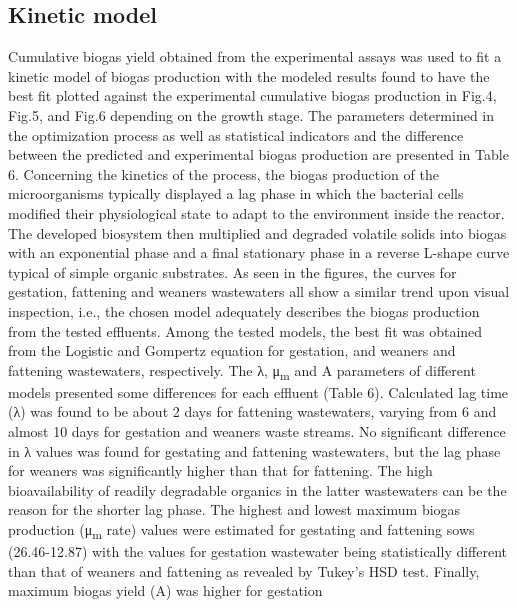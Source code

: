 \subsection{Kinetic model}
Cumulative biogas yield obtained from the experimental assays was used to fit a kinetic model of biogas production with the modeled results found to have the best fit plotted against the experimental cumulative biogas production in Fig.4, Fig.5, and Fig.6 depending on the growth stage. The parameters determined in the optimization process as well as statistical indicators and the difference between the predicted and experimental biogas production are presented in Table 6.
Concerning the kinetics of the process, the biogas production of the microorganisms typically displayed a lag phase in which the bacterial cells modified their physiological state to adapt to the environment inside the reactor. The developed biosystem then multiplied and degraded volatile solids into biogas with an exponential phase and a final stationary phase in a reverse L-shape curve typical of simple organic substrates. As seen in the figures, the curves for gestation, fattening and weaners wastewaters all show a similar trend upon visual inspection, i.e., the chosen model adequately describes the biogas production from the tested effluents. 
Among the tested models, the best fit was obtained from the Logistic and Gompertz equation for gestation, and weaners and fattening wastewaters, respectively. The λ, μ\textsubscript{m} and A  parameters of different models presented some differences for each effluent (Table 6). Calculated lag time (λ) was found to be about 2 days for fattening wastewaters, varying from 6 and almost 10 days for gestation and weaners waste streams. No significant difference in λ values was found for gestating and fattening wastewaters, but the lag phase for weaners was significantly higher than that for fattening. The high bioavailability of readily degradable organics in the latter wastewaters can be the reason for the shorter lag phase. The highest and lowest maximum biogas production (μ\textsubscript{m} rate) values were estimated for gestating and fattening sows (26.46-12.87) with the values for gestation wastewater being statistically different than that of weaners and fattening as revealed by Tukey’s HSD test. Finally, maximum biogas yield (A) was higher for gestation